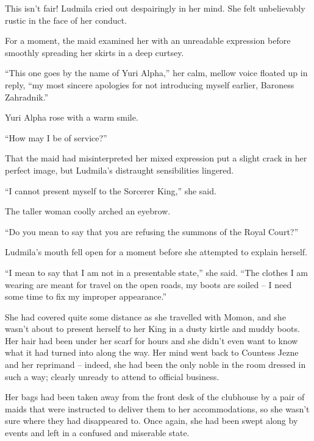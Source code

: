  

This isn’t fair! Ludmila cried out despairingly in her mind. She felt unbelievably rustic in the face of her conduct.

 

For a moment, the maid examined her with an unreadable expression before smoothly spreading her skirts in a deep curtsey.

 

“This one goes by the name of Yuri Alpha,” her calm, mellow voice floated up in reply, “my most sincere apologies for not introducing myself earlier, Baroness Zahradnik.”

 

Yuri Alpha rose with a warm smile.

 

“How may I be of service?”

 

That the maid had misinterpreted her mixed expression put a slight crack in her perfect image, but Ludmila’s distraught sensibilities lingered.

 

“I cannot present myself to the Sorcerer King,” she said.

 

The taller woman coolly arched an eyebrow.

 

“Do you mean to say that you are refusing the summons of the Royal Court?”

 

Ludmila’s mouth fell open for a moment before she attempted to explain herself.

 

“I mean to say that I am not in a presentable state,” she said. “The clothes I am wearing are meant for travel on the open roads, my boots are soiled – I need some time to fix my improper appearance.”

 

She had covered quite some distance as she travelled with Momon, and she wasn’t about to present herself to her King in a dusty kirtle and muddy boots. Her hair had been under her scarf for hours and she didn’t even want to know what it had turned into along the way. Her mind went back to Countess Jezne and her reprimand – indeed, she had been the only noble in the room dressed in such a way; clearly unready to attend to official business.

 

Her bags had been taken away from the front desk of the clubhouse by a pair of maids that were instructed to deliver them to her accommodations, so she wasn’t sure where they had disappeared to. Once again, she had been swept along by events and left in a confused and miserable state.

